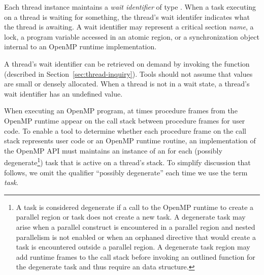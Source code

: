 Each thread instance maintains a {\em wait identifier} of type . 
When a task executing on a thread is waiting for something, the thread's wait identifer indicates what the thread is awaiting. 
A wait identifier may represent a critical section {\em name}, a lock,  a program variable accessed in an atomic region, or a synchronization object internal to an OpenMP runtime implementation. 
\begin{comment}
\begin{boxedcode}
typedef uint64\_t ompt\_wait\_id\_t;
\end{boxedcode}
\end{comment}
A thread's wait identifier can be retrieved on demand by invoking the  function (described in Section~\ref{sec:thread-inquiry}).
Tools should not assume that  values are small or densely allocated. 
When a thread is not in a wait state, a thread's wait identifier has an undefined value.
 

When executing an OpenMP program, at times procedure frames from the OpenMP runtime appear on the call stack between procedure frames for user code.
To enable a tool to determine whether each procedure frame on the call stack represents 
user code or an OpenMP runtime routine,
an implementation of the OpenMP API must maintains an instance of an  
for each (possibly degenerate\footnote{
A task is considered degenerate if a call to the OpenMP runtime to create a parallel 
region or task does not create a new task. 
A degenerate task may arise when a parallel construct is encountered
in a parallel region and nested parallelism is not enabled or when an orphaned directive that would create a task is encountered outside a parallel region.
A degenerate task region may add runtime frames to the call stack before 
invoking an outlined function for the degenerate task and thus require an  
data structure.}) task that is active on a thread's stack.
To simplify discussion that follows, 
we omit the qualifier ``possibly degenerate'' each time we use the term {\em task}.

